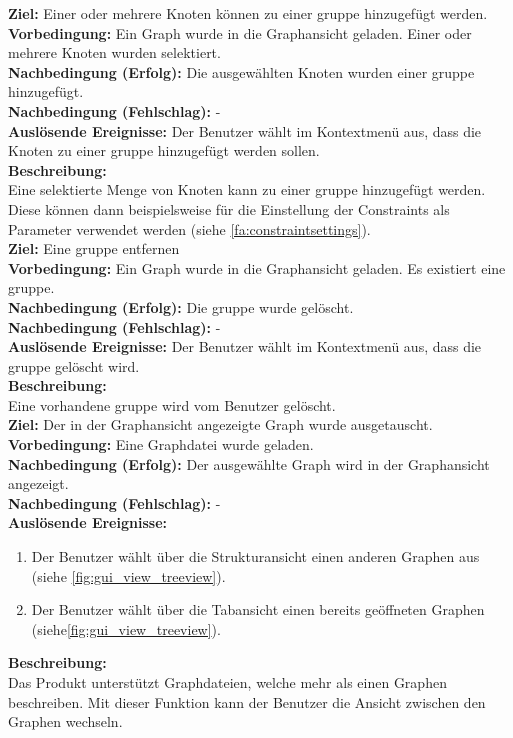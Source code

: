 \label{fa:gruppe}
\textbf{Ziel:} Einer oder mehrere Knoten können zu einer \gls{gruppe} hinzugefügt werden.\\
\textbf{Vorbedingung:} Ein Graph wurde in die Graphansicht geladen. Einer oder mehrere Knoten wurden selektiert. \\
\textbf{Nachbedingung (Erfolg):} Die ausgewählten Knoten wurden einer \gls{gruppe} hinzugefügt.\\
\textbf{Nachbedingung (Fehlschlag):} - \\
\textbf{Auslösende Ereignisse:} Der Benutzer wählt im Kontextmenü aus, dass die Knoten zu einer \gls{gruppe} hinzugefügt werden sollen. \\
\textbf{Beschreibung:}\\ Eine selektierte Menge von Knoten kann zu einer \gls{gruppe} hinzugefügt werden. Diese können dann beispielsweise für die Einstellung der Constraints als Parameter verwendet werden (siehe \ref{fa:constraintsettings}).\\

\label{fa:deletegruppe}
\textbf{Ziel:} Eine \gls{gruppe} entfernen\\
\textbf{Vorbedingung:} Ein Graph wurde in die Graphansicht geladen. Es existiert eine \gls{gruppe}.\\
\textbf{Nachbedingung (Erfolg):} Die \gls{gruppe} wurde gelöscht.\\
\textbf{Nachbedingung (Fehlschlag):} - \\
\textbf{Auslösende Ereignisse:} Der Benutzer wählt im Kontextmenü aus, dass die \gls{gruppe} gelöscht wird. \\
\textbf{Beschreibung:}\\
Eine vorhandene \gls{gruppe} wird vom Benutzer gelöscht.\\

\label{fa:graphwechsel}
\textbf{Ziel:} Der in der Graphansicht angezeigte Graph wurde ausgetauscht.\\
\textbf{Vorbedingung:} Eine Graphdatei wurde geladen.\\
\textbf{Nachbedingung (Erfolg):} Der ausgewählte Graph wird in der Graphansicht angezeigt.\\
\textbf{Nachbedingung (Fehlschlag):} -\\
\textbf{Auslösende Ereignisse:}
\begin{enumerate}[nolistsep, label=(\alph*)]
  \item Der Benutzer wählt über die Strukturansicht einen anderen Graphen aus (siehe \ref{fig:gui_view_treeview}).
  \item Der Benutzer wählt über die Tabansicht einen bereits geöffneten Graphen (siehe\ref{fig:gui_view_treeview}).
\end{enumerate}
\textbf{Beschreibung:}\\
Das Produkt unterstützt Graphdateien, welche mehr als einen Graphen beschreiben.
Mit dieser Funktion kann der Benutzer die Ansicht zwischen den Graphen wechseln.

